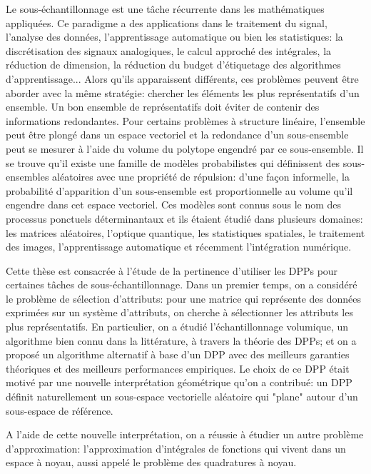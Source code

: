 \documentclass[twoside,11pt]{book}
\numberwithin{theorem}{chapter}
\numberwithin{definition}{chapter}
\numberwithin{proposition}{chapter}
\numberwithin{corollary}{chapter}
\numberwithin{example}{chapter}
\numberwithin{lemma}{chapter}
\numberwithin{assumption}{chapter}
\numberwithin{equation}{chapter}
\numberwithin{figure}{chapter}
\begin{document}
Le sous-échantillonnage est une tâche récurrente dans les mathématiques appliquées. Ce paradigme a des applications dans le traitement du signal, l'analyse des données, l'apprentissage automatique ou bien les statistiques: la discrétisation des signaux analogiques, le calcul approché des intégrales, la réduction de dimension, la réduction du budget d’étiquetage des algorithmes d'apprentissage... Alors qu'ils apparaissent différents, ces problèmes peuvent être aborder avec la même stratégie: chercher les éléments les plus représentatifs d'un ensemble. 
Un bon ensemble de représentatifs doit éviter de contenir des informations redondantes. Pour certains problèmes à structure linéaire, l'ensemble peut être plongé dans un espace vectoriel et la redondance d'un sous-ensemble peut se mesurer à l'aide du volume du polytope engendré par ce sous-ensemble. Il se trouve qu'il existe une famille de modèles probabilistes qui définissent des sous-ensembles aléatoires avec une propriété de répulsion: d'une façon informelle, la probabilité d'apparition d'un sous-ensemble est proportionnelle au volume qu'il engendre dans cet espace vectoriel. Ces modèles sont connus sous le nom des processus ponctuels déterminantaux et ils étaient étudié dans plusieurs domaines: les matrices aléatoires, l'optique quantique, les statistiques spatiales, le traitement des images, l'apprentissage automatique et récemment l'intégration numérique.

Cette thèse est consacrée à l'étude de la pertinence d'utiliser les DPPs pour certaines tâches de sous-échantillonnage.
Dans un premier temps, on a considéré le problème de sélection d'attributs: pour une matrice qui représente des données exprimées sur un système d'attributs, on cherche à sélectionner les attributs les plus représentatifs. En particulier, on a étudié l'échantillonnage volumique, un algorithme bien connu dans la littérature, à travers la théorie des DPPs; et on a proposé un algorithme alternatif à base d'un DPP avec des meilleurs garanties théoriques et des meilleurs performances empiriques. Le choix de ce DPP était motivé par une nouvelle interprétation géométrique qu'on a contribué: un DPP définit naturellement un sous-espace vectorielle aléatoire qui "plane" autour d'un sous-espace de référence. 

A l'aide de cette nouvelle interprétation, on a réussie à étudier un autre problème d'approximation: l'approximation d'intégrales de fonctions qui vivent dans un espace à noyau, aussi appelé le problème des quadratures à noyau.
\end{document}
